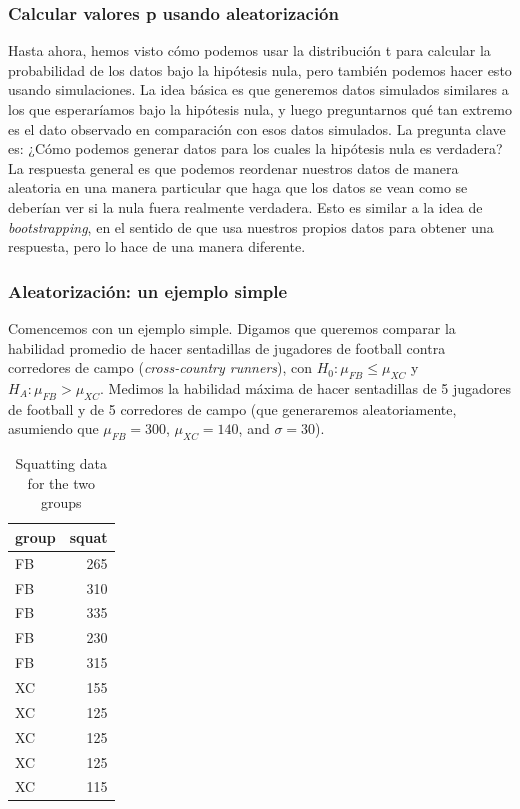 \documentclass[
  12pt,
]{book}
\begin{document}
\hypertarget{calcular-valores-p-usando-aleatorizaciuxf3n}{%
\subsubsection{Calcular valores p usando aleatorización}\label{calcular-valores-p-usando-aleatorizaciuxf3n}}

Hasta ahora, hemos visto cómo podemos usar la distribución t para calcular la probabilidad de los datos bajo la hipótesis nula, pero también podemos hacer esto usando simulaciones. La idea básica es que generemos datos simulados similares a los que esperaríamos bajo la hipótesis nula, y luego preguntarnos qué tan extremo es el dato observado en comparación con esos datos simulados. La pregunta clave es: ¿Cómo podemos generar datos para los cuales la hipótesis nula es verdadera? La respuesta general es que podemos reordenar nuestros datos de manera aleatoria en una manera particular que haga que los datos se vean como se deberían ver si la nula fuera realmente verdadera. Esto es similar a la idea de \emph{bootstrapping}, en el sentido de que usa nuestros propios datos para obtener una respuesta, pero lo hace de una manera diferente.

\hypertarget{aleatorizaciuxf3n-un-ejemplo-simple}{%
\subsubsection{Aleatorización: un ejemplo simple}\label{aleatorizaciuxf3n-un-ejemplo-simple}}

Comencemos con un ejemplo simple. Digamos que queremos comparar la habilidad promedio de hacer sentadillas de jugadores de football contra corredores de campo (\emph{cross-country runners}), con \(H_0: \mu_{FB} \le \mu_{XC}\) y \(H_A: \mu_{FB} > \mu_{XC}\). Medimos la habilidad máxima de hacer sentadillas de 5 jugadores de football y de 5 corredores de campo (que generaremos aleatoriamente, asumiendo que \(\mu_{FB} = 300\), \(\mu_{XC} = 140\), and \(\sigma = 30\)).

\begin{table}

\caption{\label{tab:squatPlot}Squatting data for the two groups}
\centering
\begin{tabular}[t]{l|r}
\hline
group & squat\\
\hline
FB & 265\\
\hline
FB & 310\\
\hline
FB & 335\\
\hline
FB & 230\\
\hline
FB & 315\\
\hline
XC & 155\\
\hline
XC & 125\\
\hline
XC & 125\\
\hline
XC & 125\\
\hline
XC & 115\\
\hline
\end{tabular}
\end{table}
\end{document}
